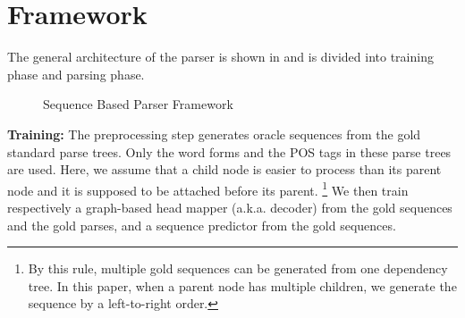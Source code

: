 \section{Framework}
The general architecture of the parser is shown in 
and is divided into training phase and parsing phase.

\begin{figure}[th]
\centering
{}
\caption{Sequence Based Parser Framework}
\label{fig:workflow}
\end{figure}

{\bf Training:} The preprocessing step generates oracle sequences
from the gold standard parse trees. Only the word forms and the POS tags
in these parse trees are used. Here, we assume that a child node is
easier to process than its parent node and it is supposed to be attached
before its parent. \footnote{By this rule, multiple gold sequences
can be generated from one dependency tree. In this paper, when a parent node
has multiple children, we generate the sequence by a left-to-right order.}
We then train respectively a graph-based head mapper (a.k.a. decoder)
from the gold sequences and the gold parses, and a sequence predictor
from the gold sequences.

